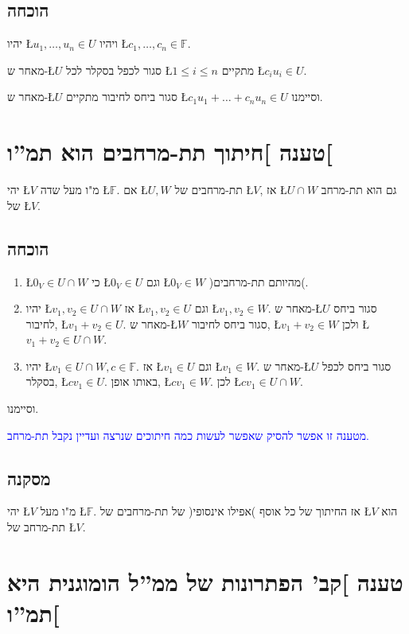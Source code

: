 \documentclass[english,hebrew]{article}
\begin{document}
\subsection{הוכחה}

יהיו \L{$u_{1},\dots,u_{n}\in U$} ויהיו \L{$c_{1},\dots,c_{n}\in\mathbb{F}$}.

מאחר ש-\L{$U$} סגור לכפל בסקלר לכל \L{$1\le i\le n$} מתקיים \L{$c_{i}u_{i}\in U$}.

מאחר ש-\L{$U$} סגור ביחס לחיבור מתקיים \L{$c_{1}u_{1}+\dots+c_{n}u_{n}\in U$}
וסיימנו.

\section{טענה {]}חיתוך תת-מרחבים הוא תמ\textquotedblright ו{[}}

יהי \L{$V$} מ"ו מעל שדה \L{$\mathbb{F}$}. אם \L{$U,W$} תת-מרחבים
של \L{$V$}, אז \L{$U\cap W$} גם הוא תת-מרחב של \L{$V$}.

\subsection{הוכחה}
\begin{enumerate}
\item \L{$0_{V}\in U\cap W$} כי \L{$0_{V}\in U$} וגם \L{$0_{V}\in W$}
)מהיותם תת-מרחבים(. 
\item יהיו \L{$v_{1},v_{2}\in U\cap W$} אז \L{$v_{1},v_{2}\in U$} וגם
\L{$v_{1},v_{2}\in W$}. מאחר ש-\L{$U$} סגור ביחס לחיבור, \L{$v_{1}+v_{2}\in U$}.
מאחר ש-\L{$W$} סגור ביחס לחיבור, \L{$v_{1}+v_{2}\in W$} ולכן \L{$v_{1}+v_{2}\in U\cap W$}. 
\item יהיו \L{$v_{1}\in U\cap W,c\in\mathbb{F}$}. אז \L{$v_{1}\in U$}
וגם \L{$v_{1}\in W$}. מאחר ש-\L{$U$} סגור ביחס לכפל בסקלר, \L{$cv_{1}\in U$}.
באותו אופן, \L{$cv_{1}\in W$}. לכן \L{$cv_{1}\in U\cap W$}. 
\end{enumerate}
וסיימנו.

\textcolor{blue}{מטענה זו אפשר להסיק שאפשר לעשות כמה חיתוכים שנרצה
ועדיין נקבל תת-מרחב.}

\subsection{מסקנה}

יהי \L{$V$} מ"ו מעל \L{$\mathbb{F}$}. אז החיתוך של כל אוסף )אפילו
אינסופי( של תת-מרחבים של \L{$V$} הוא תת-מרחב של \L{$V$}.

\section{טענה {]}קב' הפתרונות של ממ\textquotedblright ל הומוגנית היא תמ\textquotedblright ו{[}}
\end{document}
